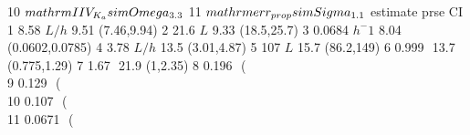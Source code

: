 \begin{Schunk}
\begin{Soutput}
10                                                                    $\\mathrm{IIV_{K_{a}}\\sim \\Omega_{3.3}}$
11                                                                     $\\mathrm{err_{prop}\\sim \\Sigma_{1.1}}$
                 estimate prse              CI
1            8.58 $ L/h $ 9.51     (7.46,9.94)
2              21.6 $ L $ 9.33     (18.5,25.7)
3        0.0684 $ h^-1  $ 8.04 (0.0602,0.0785)
4            3.78 $ L/h $ 13.5     (3.01,4.87)
5               107 $ L $ 15.7      (86.2,149)
6              0.999 $  $ 13.7    (0.775,1.29)
7               1.67 $  $ 21.9        (1,2.35)
8   0.196 $  $ (\\%CV=NA) 23.1   (0.115,0.255)
9   0.129 $  $ (\\%CV=NA) 30.4  (0.0641,0.184)
10  0.107 $  $ (\\%CV=NA) 25.2  (0.0651,0.147)
11 0.0671 $  $ (\\%CV=NA) 11.4 (0.0548,0.0803)
\end{Soutput}
\end{Schunk}
%
